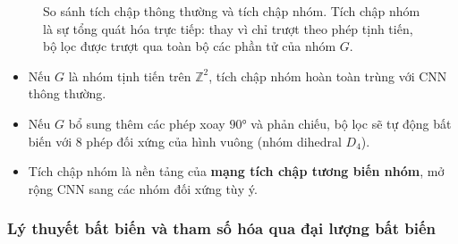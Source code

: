 \begin{figure}[H]
\centering
{}
\caption{So sánh tích chập thông thường và tích chập nhóm. Tích chập nhóm là sự tổng quát hóa trực tiếp: thay vì chỉ trượt theo phép tịnh tiến, bộ lọc được trượt qua toàn bộ các phần tử của nhóm $G$.}
\label{fig:group-conv-compare}
\end{figure}

\begin{itemize}
    \item Nếu $G$ là nhóm tịnh tiến trên $\mathbb{Z}^2$, tích chập nhóm hoàn toàn trùng với CNN thông thường.
    \item Nếu $G$ bổ sung thêm các phép xoay $90°$ và phản chiếu, bộ lọc sẽ tự động bất biến với 8 phép đối xứng của hình vuông (nhóm dihedral $D_4$).
    \item Tích chập nhóm là nền tảng của \textbf{mạng tích chập tương biến nhóm}, mở rộng CNN sang các nhóm đối xứng tùy ý.
\end{itemize}


\subsubsection{Lý thuyết bất biến và tham số hóa qua đại lượng bất biến}
\label{subsubsec:invariant-theory}

